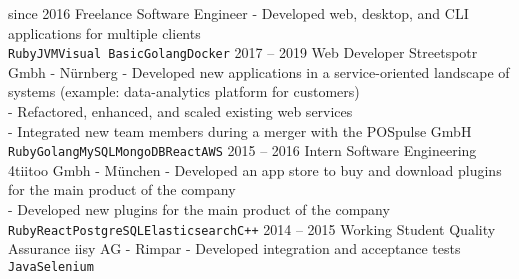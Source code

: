 \documentclass[9pt]{../developercv} %
\begin{document}


\begin{entrylist}
	\entry
		{since 2016}
		{Freelance Software Engineer}
		{}
		{- Developed web, desktop, and CLI applications for multiple clients\\
                 \texttt{Ruby}\slashsep\texttt{JVM}\slashsep\texttt{Visual Basic}\slashsep\texttt{Golang}\slashsep\texttt{Docker}}
	\entry
		{2017 -- 2019}
		{Web Developer}
		{Streetspotr Gmbh - Nürnberg}
		{- Developed new applications in a service-oriented landscape of systems (example: data-analytics platform for customers)\\
                 - Refactored, enhanced, and scaled existing web services\\
                 - Integrated new team members during a merger with the POSpulse GmbH\\
                 \texttt{Ruby}\slashsep\texttt{Golang}\slashsep\texttt{MySQL}\slashsep\texttt{MongoDB}\slashsep\texttt{React}\slashsep\texttt{AWS}}
	\entry
		{2015 -- 2016}
		{Intern Software Engineering}
		{4tiitoo Gmbh - München}
		{- Developed an app store to buy and download plugins for the main product of the company\\
                 - Developed new plugins for the main product of the company\\
                 \texttt{Ruby}\slashsep\texttt{React}\slashsep\texttt{PostgreSQL}\slashsep\texttt{Elasticsearch}\slashsep\texttt{C++}}
	\entry
		{2014 -- 2015}
		{Working Student Quality Assurance}
		{iisy AG - Rimpar}
		{- Developed integration and acceptance tests\\
                 \texttt{Java}\slashsep\texttt{Selenium}}
\end{entrylist}

\end{document}
